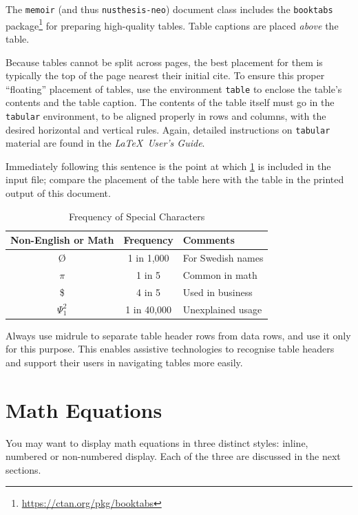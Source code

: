 The \texttt{memoir} (and thus \texttt{nusthesis-neo}) document class includes the
\texttt{booktabs} package\footnote{\url{https://ctan.org/pkg/booktabs}} for preparing
high-quality tables. Table captions are placed {\itshape above} the table.

Because tables cannot be split across pages, the best placement for
them is typically the top of the page nearest their initial cite.  To
ensure this proper ``floating'' placement of tables, use the
environment \texttt{table} to enclose the table's contents and the
table caption.  The contents of the table itself must go in the
\texttt{tabular} environment, to be aligned properly in rows and
columns, with the desired horizontal and vertical rules.  Again,
detailed instructions on \texttt{tabular} material are found in the
\textit{\LaTeX\ User's Guide}.

Immediately following this sentence is the point at which
\cref{tab:freq} is included in the input file; compare the
placement of the table here with the table in the printed output of
this document.

\begin{table}
  \caption{Frequency of Special Characters}
  \label{tab:freq}
  \centering
  \begin{tabular}{ccl}
    \toprule
    Non-English or Math&Frequency&Comments\\
    \midrule
    \O & 1 in 1,000& For Swedish names\\
    $\pi$ & 1 in 5& Common in math\\
    \$ & 4 in 5 & Used in business\\
    $\Psi^2_1$ & 1 in 40,000& Unexplained usage\\
  \bottomrule
\end{tabular}
\end{table}

Always use midrule to separate table header rows from data rows, and
use it only for this purpose. This enables assistive technologies to
recognise table headers and support their users in navigating tables
more easily.

\section{Math Equations}
You may want to display math equations in three distinct styles:
inline, numbered or non-numbered display.  Each of the three are
discussed in the next sections.

